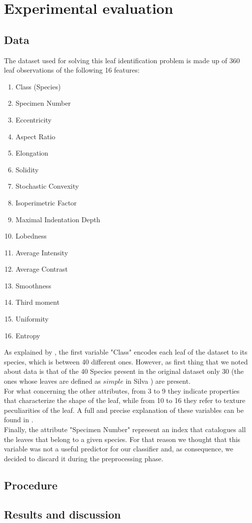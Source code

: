 \documentclass{article}
\begin{document}
\section{Experimental evaluation}

\subsection{Data}
The dataset used for solving this leaf identification problem is made up of 360 leaf observations of the following 16 features:
\begin{multicols}{3}
	\begin{enumerate}
		\item Class (Species)
		\item Specimen Number
		\item Eccentricity
		\item Aspect Ratio
		\item Elongation
		\item Solidity
		\item Stochastic Convexity
		\item Isoperimetric Factor
		\item Maximal Indentation Depth
		\item Lobedness
		\item Average Intensity
		\item Average Contrast
		\item Smoothness
		\item Third moment
		\item Uniformity
		\item Entropy
	\end{enumerate}
\end{multicols}
\noindent As explained by \cite{silva}, the first variable "Class" encodes each leaf of the dataset to its species, which is between 40 different ones. However, as first thing that we noted about data is that of the 40 Species present in the original dataset only 30 (the ones whose leaves are defined as $\textit{simple}$ in Silva \cite{silva}) are present.
\\For what concerning the other attributes, from 3 to 9 they indicate properties that characterize the shape of the leaf, while from 10 to 16 they refer to texture peculiarities of the leaf. A full and precise explanation of these variables can be found in \cite{silva}.
\\Finally, the attribute "Specimen Number" represent an index that catalogues all the leaves that belong to a given species. For that reason we thought that this variable was not a useful predictor for our classifier and, as consequence, we decided to discard it during the preprocessing phase.

\subsection{Procedure}

\subsection{Results and discussion}



\newpage


\end{document}
